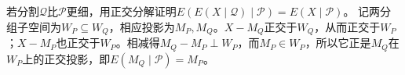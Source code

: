 若分割\(\mathcal Q\)比\(\mathcal P\)更细，用正交分解证明\(E(E(X\mid\mathcal Q)\mid\mathcal P)=E(X\mid\mathcal P)\)。
\solutionanswer
记两分组子空间为\(W_P\subseteq W_Q\)，相应投影为\(M_P,M_Q\)。\(X-M_Q\)正交于\(W_Q\)，从而正交于\(W_P\)；\(X-M_P\)也正交于\(W_P\)。相减得\(M_Q-M_P\perp W_P\)，而\(M_P\in W_P\)，所以它正是\(M_Q\)在\(W_P\)上的正交投影，即\(E(M_Q\mid\mathcal P)=M_P\)。
\par
